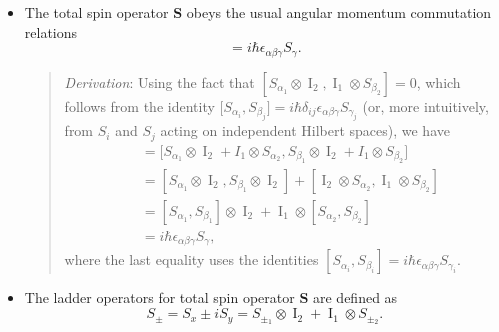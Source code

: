 \documentclass[11pt, a4paper]{article}
\renewcommand{\vec}[1]{\bm{#1}}  %
\renewcommand{\S}{\vec{S}}  %
\newcommand{\II}{\operatorname{I}}  %
\begin{document}
\begin{itemize}
    \item The total spin operator $ \vec{S} $ obeys the usual angular momentum commutation relations
    \begin{equation*}
        [S_{\alpha}, S_{\beta}] = i \hbar \epsilon_{\alpha\beta\gamma}S_{\gamma}.
    \end{equation*}
    \begin{quote}
        \textit{Derivation}: Using the fact that $ [S_{\alpha_{1}} \otimes \II_{2}, \II_{1} \otimes S_{\beta_{2}}] = 0 $, which follows from the identity $ \big[S_{\alpha_{i}}, S_{\beta_{j}}\big] = i \hbar \delta_{ij}\epsilon_{\alpha \beta \gamma}S_{\gamma_{j}} $ (or, more intuitively, from $ S_{i} $ and $ S_{j} $ acting on independent Hilbert spaces), we have
        \begin{align*}
            [S_{\alpha}, S_{\beta}] &= \big[ S_{\alpha_{1}} \otimes \II_{2} + I_{1} \otimes S_{\alpha_{2}}, S_{\beta_{1}}\otimes \II_{2} + I_{1}\otimes S_{\beta_{2}} \big]\\
            & = [S_{\alpha_{1}} \otimes \II_{2}, S_{\beta_{1}}\otimes\II_{2}] + [\II_{2} \otimes S_{\alpha_{2}}, \II_{1} \otimes S_{\beta_{2}}]\\
            & = [S_{\alpha_{1}}, S_{\beta_{1}}] \otimes \II_{2} + \II_{1} \otimes [S_{\alpha_{2}}, S_{\beta_{2}}]\\
            & = i \hbar \epsilon_{\alpha\beta\gamma}S_{\gamma},
        \end{align*}
        where the last equality uses the identities $ [S_{\alpha_{i}}, S_{\beta_{i}}] = i \hbar \epsilon_{\alpha\beta\gamma}S_{\gamma_{i}} $.
    \end{quote}
    
    \item The ladder operators for total spin operator $ \S $ are defined as
    \begin{equation*}
        S_{\pm} = S_{x} \pm iS_{y} = S_{\pm_{1}} \otimes \II_{2} + \II_{1} \otimes S_{\pm_{2}}.
    \end{equation*}

\end{itemize}
\end{document}
